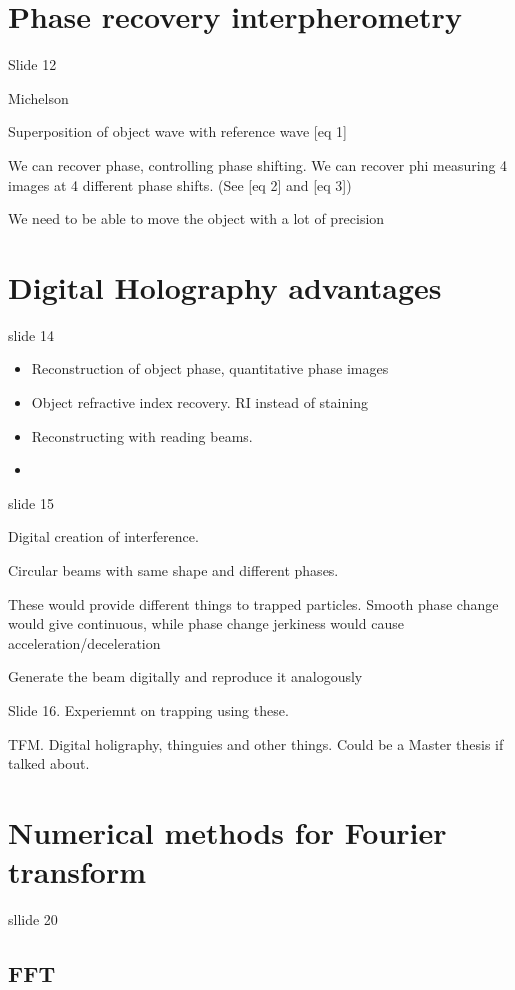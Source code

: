 \documentclass[../main/main.tex]{subfiles}
\begin{document}
\section{Phase recovery interpherometry }
Slide 12

Michelson

Superposition of object wave with reference wave [eq 1]

We can recover phase, controlling phase shifting.
We can recover phi measuring 4 images at 4 different phase shifts. (See [eq 2] and [eq 3])

We need to be able to move the object with a lot of precision

\section{Digital Holography advantages}

slide 14

\begin{itemize}
	\item Reconstruction of object phase, quantitative phase images
	\item Object refractive index recovery. RI instead of staining
	\item Reconstructing with reading beams.
	\item
\end{itemize}


slide 15

Digital creation of interference.

Circular beams with same shape and different phases.

These would provide different things to trapped particles.
Smooth phase change would give continuous, while phase change jerkiness would cause acceleration/deceleration

Generate the beam digitally and reproduce it analogously

Slide 16. Experiemnt on trapping using these.


TFM. Digital holigraphy, thinguies and other things. Could be a Master thesis if talked about.


\section{Numerical methods for Fourier transform}

sllide 20

\subsection{FFT}
\end{document}

